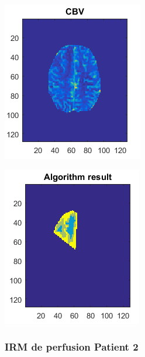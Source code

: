 \documentclass{beamer}
\begin{document}
\begin{frame}
\centering
\includegraphics[scale=0.80]{Patient2Result-CBV.png}

\end{frame}

\begin{frame}
\centering
\includegraphics[scale=0.80]{Patient2Result-ALGO.png}

\end{frame}


\begin{frame}
\frametitle{IRM de perfusion Patient 2}


\end{frame}
\end{document}
